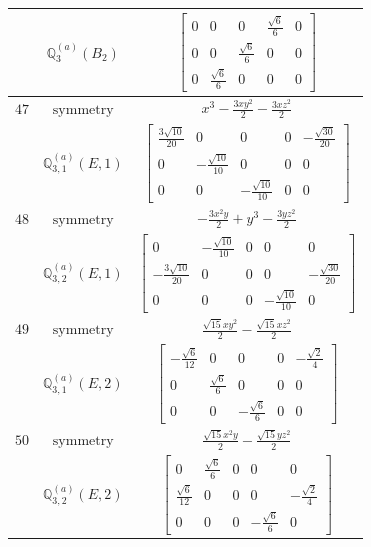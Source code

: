 \documentclass[fleqn,8pt,landscape]{jsarticle}
\begin{document}
\begin{longtable}{ccc}
$  $ & $ \mathbb{Q}_{3}^{(a)}(B_{2}) $ & $ \begin{bmatrix} 0 & 0 & 0 & \frac{\sqrt{6}}{6} & 0 \\ 0 & 0 & \frac{\sqrt{6}}{6} & 0 & 0 \\ 0 & \frac{\sqrt{6}}{6} & 0 & 0 & 0 \end{bmatrix} $ \\ \hline
$ 47 $ & $ \text{symmetry} $ & $ x^{3} - \frac{3 x y^{2}}{2} - \frac{3 x z^{2}}{2} $ \\
$  $ & $ \mathbb{Q}_{3,1}^{(a)}(E,1) $ & $ \begin{bmatrix} \frac{3 \sqrt{10}}{20} & 0 & 0 & 0 & - \frac{\sqrt{30}}{20} \\ 0 & - \frac{\sqrt{10}}{10} & 0 & 0 & 0 \\ 0 & 0 & - \frac{\sqrt{10}}{10} & 0 & 0 \end{bmatrix} $ \\ \hline
$ 48 $ & $ \text{symmetry} $ & $ - \frac{3 x^{2} y}{2} + y^{3} - \frac{3 y z^{2}}{2} $ \\
$  $ & $ \mathbb{Q}_{3,2}^{(a)}(E,1) $ & $ \begin{bmatrix} 0 & - \frac{\sqrt{10}}{10} & 0 & 0 & 0 \\ - \frac{3 \sqrt{10}}{20} & 0 & 0 & 0 & - \frac{\sqrt{30}}{20} \\ 0 & 0 & 0 & - \frac{\sqrt{10}}{10} & 0 \end{bmatrix} $ \\ \hline
$ 49 $ & $ \text{symmetry} $ & $ \frac{\sqrt{15} x y^{2}}{2} - \frac{\sqrt{15} x z^{2}}{2} $ \\
$  $ & $ \mathbb{Q}_{3,1}^{(a)}(E,2) $ & $ \begin{bmatrix} - \frac{\sqrt{6}}{12} & 0 & 0 & 0 & - \frac{\sqrt{2}}{4} \\ 0 & \frac{\sqrt{6}}{6} & 0 & 0 & 0 \\ 0 & 0 & - \frac{\sqrt{6}}{6} & 0 & 0 \end{bmatrix} $ \\ \hline
$ 50 $ & $ \text{symmetry} $ & $ \frac{\sqrt{15} x^{2} y}{2} - \frac{\sqrt{15} y z^{2}}{2} $ \\
$  $ & $ \mathbb{Q}_{3,2}^{(a)}(E,2) $ & $ \begin{bmatrix} 0 & \frac{\sqrt{6}}{6} & 0 & 0 & 0 \\ \frac{\sqrt{6}}{12} & 0 & 0 & 0 & - \frac{\sqrt{2}}{4} \\ 0 & 0 & 0 & - \frac{\sqrt{6}}{6} & 0 \end{bmatrix} $ \\ \hline

\end{longtable}
\end{document}

